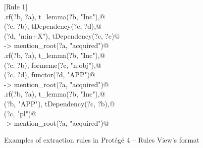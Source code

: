 \documentclass[10pt, conference, compsocconf]{IEEEtran}
\begin{document}
\begin{figure}
\small
[Rule 1]\\
\verb@lex.rf(?b, ?a), t_lemma(?b, "Inc"),@\\
\verb@tDependency(?c, ?b), tDependency(?c, ?d),@\\
\verb@formeme(?d, "n:in+X"), tDependency(?c, ?e)@\\
\verb@      -> mention_root(?a, "acquired")@
\smallskip\newline
[Rule 11]\\
\verb@lex.rf(?b, ?a), t_lemma(?b, "Inc"),@\\
\verb@tDependency(?c, ?b), formeme(?c, "n:obj"),@\\
\verb@tDependency(?c, ?d), functor(?d, "APP")@\\
\verb@      -> mention_root(?a, "acquired")@   
\smallskip\newline
[Rule 75]\\
\verb@lex.rf(?b, ?a), t_lemma(?b, "Inc"),@\\
\verb@functor(?b, "APP"), tDependency(?c, ?b),@\\
\verb@number(?c, "pl")@\\
\verb@      -> mention_root(?a, "acquired")@   
	\caption{Examples of extraction rules in Prot\'{e}g\'{e} 4 -- Rules View's format}
	\label{img:rules_protege}
\end{figure}
\end{document}
